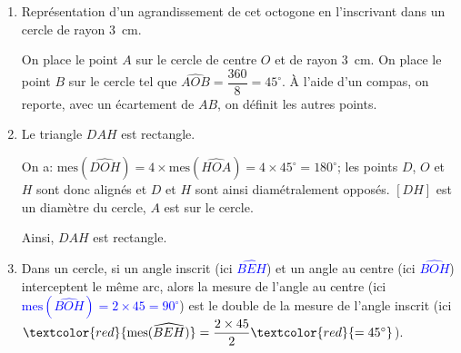 
\begin{enumerate}
\item Représentation d'un agrandissement de cet octogone en l'inscrivant dans un cercle de rayon 3~cm. 
\begin{center}
\end{center}
On place le point $A$ sur le cercle de centre $O$ et de rayon 3~cm. On place le point $B$ sur le cercle tel que $\widehat{AOB}=\dfrac{360}{8}=45^{\circ}$. \`A l'aide d'un compas, on reporte,  avec un écartement de $AB$, on définit les autres points.
\item Le triangle $DAH$ est rectangle.

On a: $\text{mes}(\widehat{DOH})=4\times\text{mes}(\widehat{HOA})=4\times45^{\circ}=180^{\circ}$; les points $D$, $O$ et $H$ sont donc alignés et $D$ et $H$ sont ainsi diamétralement opposés. $[DH]$ est un diamètre du cercle, $A$ est sur le cercle.

Ainsi, $DAH$ est rectangle.
\item Dans un cercle, si un angle inscrit (ici \textcolor{blue}{$\widehat{BEH}$}) et un angle au centre (ici \textcolor{blue}{$\widehat{BOH}$}) interceptent le même arc, alors la mesure de l'angle au centre (ici \textcolor{blue}{$\text{mes}(\widehat{BOH})=2\times 45= 90^{\circ}$}) est le double de la mesure de l'angle inscrit (ici $\textcolor{red}{\text{mes}(\widehat{BEH})}=\dfrac{2\times 45}{2}\textcolor{red}{= 45^{\circ}}$).
\end{enumerate}

\vspace{0.5cm}

